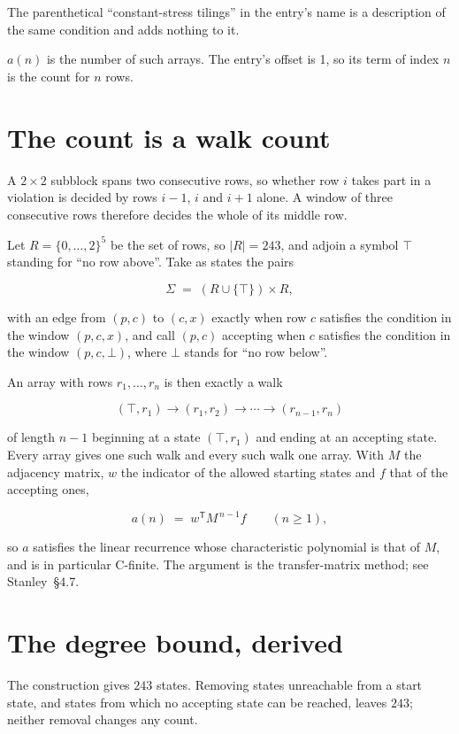 \documentclass[11pt]{article}
\theoremstyle{definition}
\begin{document}
The parenthetical ``constant-stress tilings'' in the entry's name is a description of the same condition and adds nothing to it.

$a(n)$ is the number of such arrays. The entry's offset is 1, so its term of index $n$ is the count for $n$ rows.

\section{The count is a walk count}

A $2 \times 2$ subblock spans two consecutive rows, so whether row $i$ takes part in a violation is decided by rows $i-1$, $i$ and $i+1$ alone. A window of three consecutive rows therefore decides the whole of its middle row.

Let $R = \{0,\dots,2\}^{5}$ be the set of rows, so $|R| = 243$, and adjoin a symbol $\top$ standing for ``no row above''. Take as states the pairs

\[\Sigma \;=\; (R \cup \{\top\}) \times R,\]

with an edge from $(p,c)$ to $(c,x)$ exactly when row $c$ satisfies the condition in the window $(p,c,x)$, and call $(p,c)$ accepting when $c$ satisfies the condition in the window $(p,c,\bot)$, where $\bot$ stands for ``no row below''.

An array with rows $r_1,\dots,r_n$ is then exactly a walk

\[(\top,r_1) \to (r_1,r_2) \to \cdots \to (r_{n-1},r_n)\]

of length $n-1$ beginning at a state $(\top,r_1)$ and ending at an accepting state. Every array gives one such walk and every such walk one array. With $M$ the adjacency matrix, $w$ the indicator of the allowed starting states and $f$ that of the accepting ones,

\[a(n) \;=\; w^{\mathsf T} M^{\,n-1} f \qquad (n \ge 1),\]

so $a$ satisfies the linear recurrence whose characteristic polynomial is that of $M$, and is in particular C-finite. The argument is the transfer-matrix method; see Stanley~\S4.7.

\section{The degree bound, derived}

The construction gives $243$ states. Removing states unreachable from a start state, and states from which no accepting state can be reached, leaves $243$; neither removal changes any count.
\end{document}
